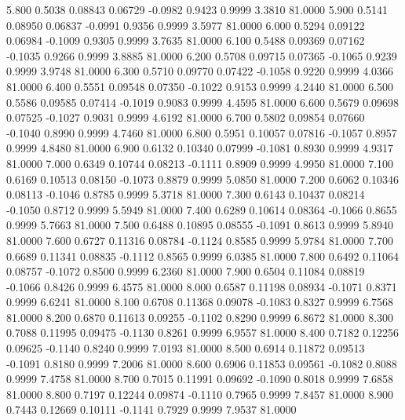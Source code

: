    5.800   0.5038   0.08843   0.06729  -0.0982   0.9423   0.9999   3.3810  81.0000
   5.900   0.5141   0.08950   0.06837  -0.0991   0.9356   0.9999   3.5977  81.0000
   6.000   0.5294   0.09122   0.06984  -0.1009   0.9305   0.9999   3.7635  81.0000
   6.100   0.5488   0.09369   0.07162  -0.1035   0.9266   0.9999   3.8885  81.0000
   6.200   0.5708   0.09715   0.07365  -0.1065   0.9239   0.9999   3.9748  81.0000
   6.300   0.5710   0.09770   0.07422  -0.1058   0.9220   0.9999   4.0366  81.0000
   6.400   0.5551   0.09548   0.07350  -0.1022   0.9153   0.9999   4.2440  81.0000
   6.500   0.5586   0.09585   0.07414  -0.1019   0.9083   0.9999   4.4595  81.0000
   6.600   0.5679   0.09698   0.07525  -0.1027   0.9031   0.9999   4.6192  81.0000
   6.700   0.5802   0.09854   0.07660  -0.1040   0.8990   0.9999   4.7460  81.0000
   6.800   0.5951   0.10057   0.07816  -0.1057   0.8957   0.9999   4.8480  81.0000
   6.900   0.6132   0.10340   0.07999  -0.1081   0.8930   0.9999   4.9317  81.0000
   7.000   0.6349   0.10744   0.08213  -0.1111   0.8909   0.9999   4.9950  81.0000
   7.100   0.6169   0.10513   0.08150  -0.1073   0.8879   0.9999   5.0850  81.0000
   7.200   0.6062   0.10346   0.08113  -0.1046   0.8785   0.9999   5.3718  81.0000
   7.300   0.6143   0.10437   0.08214  -0.1050   0.8712   0.9999   5.5949  81.0000
   7.400   0.6289   0.10614   0.08364  -0.1066   0.8655   0.9999   5.7663  81.0000
   7.500   0.6488   0.10895   0.08555  -0.1091   0.8613   0.9999   5.8940  81.0000
   7.600   0.6727   0.11316   0.08784  -0.1124   0.8585   0.9999   5.9784  81.0000
   7.700   0.6689   0.11341   0.08835  -0.1112   0.8565   0.9999   6.0385  81.0000
   7.800   0.6492   0.11064   0.08757  -0.1072   0.8500   0.9999   6.2360  81.0000
   7.900   0.6504   0.11084   0.08819  -0.1066   0.8426   0.9999   6.4575  81.0000
   8.000   0.6587   0.11198   0.08934  -0.1071   0.8371   0.9999   6.6241  81.0000
   8.100   0.6708   0.11368   0.09078  -0.1083   0.8327   0.9999   6.7568  81.0000
   8.200   0.6870   0.11613   0.09255  -0.1102   0.8290   0.9999   6.8672  81.0000
   8.300   0.7088   0.11995   0.09475  -0.1130   0.8261   0.9999   6.9557  81.0000
   8.400   0.7182   0.12256   0.09625  -0.1140   0.8240   0.9999   7.0193  81.0000
   8.500   0.6914   0.11872   0.09513  -0.1091   0.8180   0.9999   7.2006  81.0000
   8.600   0.6906   0.11853   0.09561  -0.1082   0.8088   0.9999   7.4758  81.0000
   8.700   0.7015   0.11991   0.09692  -0.1090   0.8018   0.9999   7.6858  81.0000
   8.800   0.7197   0.12244   0.09874  -0.1110   0.7965   0.9999   7.8457  81.0000
   8.900   0.7443   0.12669   0.10111  -0.1141   0.7929   0.9999   7.9537  81.0000
